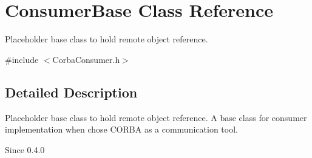 \section{ConsumerBase Class Reference}
\label{classConsumerBase}


Placeholder base class to hold remote object reference.  




{\ttfamily \#include $<$CorbaConsumer.h$>$}



\subsection{Detailed Description}
Placeholder base class to hold remote object reference. A base class for consumer implementation when chose CORBA as a communication tool.

\begin{DoxySince}{Since}
0.4.0 
\end{DoxySince}
